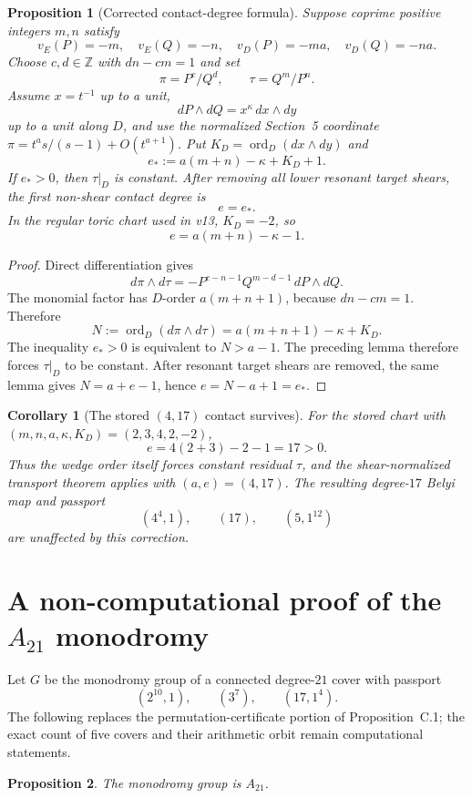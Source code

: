 \documentclass[11pt]{article}
\newtheorem{proposition}{Proposition}
\newtheorem{corollary}{Corollary}
\newcommand{\ord}{\operatorname{ord}}
\begin{document}
\begin{proposition}[Corrected contact-degree formula]
Suppose coprime positive integers $m,n$ satisfy
\[
 v_E(P)=-m,\quad v_E(Q)=-n,\quad
 v_D(P)=-ma,\quad v_D(Q)=-na.
\]
Choose $c,d\in\mathbb Z$ with $dn-cm=1$ and set
\[
 \pi=P^c/Q^d,\qquad \tau=Q^m/P^n.
\]
Assume $x=t^{-1}$ up to a unit,
\[
 dP\wedge dQ=x^\kappa\,dx\wedge dy
\]
up to a unit along $D$, and use the normalized Section~5 coordinate
$\pi=t^a s/(s-1)+O(t^{a+1})$.  Put
$K_D=\ord_D(dx\wedge dy)$ and
\[
 e_*:=a(m+n)-\kappa+K_D+1.
\]
If $e_*>0$, then $\tau|_D$ is constant.  After removing all lower resonant
target shears, the first non-shear contact degree is
\[
 \boxed{e=e_*.}
\]
In the regular toric chart used in v13, $K_D=-2$, so
\[
 \boxed{e=a(m+n)-\kappa-1.}
\]
\end{proposition}

\begin{proof}
Direct differentiation gives
\[
 d\pi\wedge d\tau
 =-P^{c-n-1}Q^{m-d-1}\,dP\wedge dQ.
\]
The monomial factor has $D$-order $a(m+n+1)$, because
$dn-cm=1$.  Therefore
\[
 N:=\ord_D(d\pi\wedge d\tau)
   =a(m+n+1)-\kappa+K_D.
\]
The inequality $e_*>0$ is equivalent to $N>a-1$.  The preceding lemma
therefore forces $\tau|_D$ to be constant.  After resonant target shears are
removed, the same lemma gives $N=a+e-1$, hence
$e=N-a+1=e_*$.
\end{proof}

\begin{corollary}[The stored $(4,17)$ contact survives]
For the stored chart with $(m,n,a,\kappa,K_D)=(2,3,4,2,-2)$,
\[
 e=4(2+3)-2-1=17>0.
\]
Thus the wedge order itself forces constant residual $\tau$, and the
shear-normalized transport theorem applies with $(a,e)=(4,17)$.  The
resulting degree-$17$ Belyi map and passport
\[
 (4^4,1),\qquad (17),\qquad (5,1^{12})
\]
are unaffected by this correction.
\end{corollary}

\section{A non-computational proof of the $A_{21}$ monodromy}

Let $G$ be the monodromy group of a connected degree-$21$ cover with
passport
\[
 (2^{10},1),\qquad (3^7),\qquad (17,1^4).
\]
The following replaces the permutation-certificate portion of
Proposition~C.1; the exact count of five covers and their arithmetic orbit
remain computational statements.

\begin{proposition}
The monodromy group is $A_{21}$.
\end{proposition}
\end{document}
